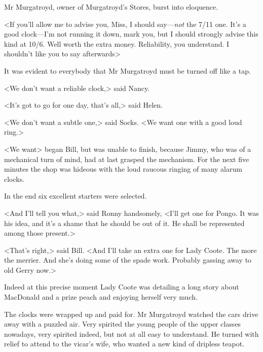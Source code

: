Mr Murgatroyd, owner of Murgatroyd's Stores, burst into eloquence.

<If you'll allow me to advise you, Miss, I should say—\emph{not} the 7/11 one. It's a good clock—I'm not running it down, mark you, but I should strongly advise this kind at 10/6. Well worth the extra money. Reliability, you understand. I shouldn't like you to say afterwards\longdash>

It was evident to everybody that Mr Murgatroyd must be turned off like a tap.

<We don't want a reliable clock,> said Nancy.

<It's got to go for one day, that's all,> said Helen.

<We don't want a subtle one,> said Socks. <We want one with a good loud ring.>

<We want\longdash> began Bill, but was unable to finish, because Jimmy, who was of a mechanical turn of mind, had at last grasped the mechanism. For the next five minutes the shop was hideous with the loud raucous ringing of many alarum clocks.

In the end six excellent starters were selected.

<And I'll tell you what,> said Ronny handsomely, <I'll get one for Pongo. It was his idea, and it's a shame that he should be out of it. He shall be represented among those present.>

<That's right,> said Bill. <And I'll take an extra one for Lady Coote. The more the merrier. And she's doing some of the spade work. Probably gassing away to old Gerry now.>

Indeed at this precise moment Lady Coote was detailing a long story about MacDonald and a prize peach and enjoying herself very much.

The clocks were wrapped up and paid for. Mr Murgatroyd watched the cars drive away with a puzzled air. Very spirited the young people of the upper classes nowadays, very spirited indeed, but not at all easy to understand. He turned with relief to attend to the vicar's wife, who wanted a new kind of dripless teapot.